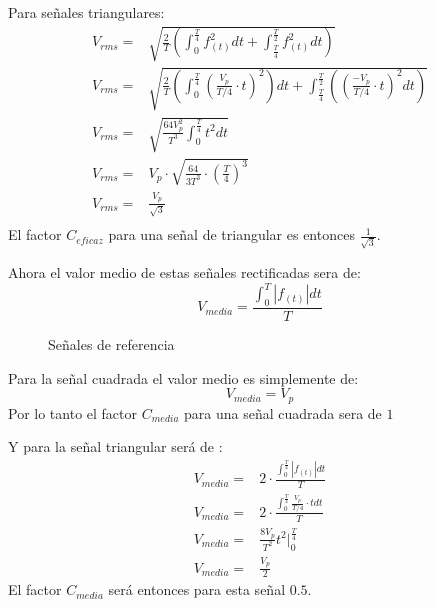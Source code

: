 Para señales triangulares:
\begin{equation}
    \begin{aligned}
         V_{rms}=&\sqrt{\frac{2}{T}(\int_{0}^{\frac{T}{4}}f_{(t)}^2dt+\int_{\frac{T}{4}}^{\frac{T}{2}}f_{(t)}^2dt)}\\
         V_{rms}=&\sqrt{\frac{2}{T}(\int_{0}^{\frac{T}{4}}(\frac{V_{p}}{T/4}\cdot t)^2)dt+\int_{\frac{T}{4}}^{\frac{T}{2}}((\frac{-V_{p}}{T/4}\cdot t)^2dt)}\\
          V_{rms}=&\sqrt{\frac{64V_{p}^2}{T^3}\int_{0}^{\frac{T}{4}}t^2dt}\\
          V_{rms}=&V_{p}\cdot\sqrt{\frac{64}{3T^3}\cdot(\frac{T}{4})^3}\\
          V_{rms}=&\frac{V_{p}}{\sqrt{3}}\\
    \end{aligned}
\end{equation}
El factor $C_{eficaz}$ para una señal de triangular es entonces $\frac{1}{\sqrt{3}}$.

Ahora el valor medio de estas señales rectificadas sera de:
\begin{equation}
    V_{media}=\frac{\int_{0}^{T} |f_{(t)}|dt}{T}
\end{equation}
\begin{figure}[H]
    \centering
    \begin{minipage}{0.49\textwidth}
        \centering
        
    \end{minipage}
    \begin{minipage}{0.49\textwidth}
        \centering
        
    \end{minipage}
   
    \caption{Señales de referencia}
    \label{fig:Señref}
\end{figure}
Para la señal cuadrada el valor medio es simplemente de:
\begin{equation}
    V_{media}=V_p
\end{equation}
Por lo tanto el factor $C_{media}$ para una señal cuadrada sera de $1$

Y para la señal triangular será de :
\begin{equation}
    \begin{aligned}
         V_{media}=&2\cdot\frac{\int_{0}^{\frac{T}{4}} |f_{(t)}|dt}{T}\\
         V_{media}=&2\cdot\frac{\int_{0}^{\frac{T}{4}} \frac{V_{p}}{T/4}\cdot t dt}{T}\\
         V_{media}=&\frac{8V_{p}}{T^2}t^2|_{0}^{\frac{T}{4}}\\
         V_{media}=&\frac{V_{p}}{2}
    \end{aligned}
\end{equation}
El factor $C_{media}$ será entonces para esta señal $0.5$.

